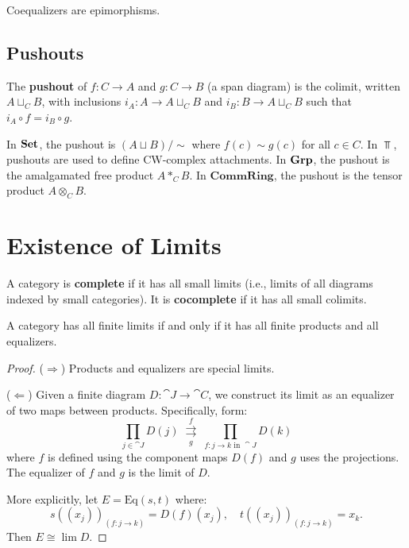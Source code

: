 \begin{proposition}
Coequalizers are epimorphisms.
\end{proposition}

\subsection{Pushouts}

\begin{definition}[Pushout]
The \textbf{pushout} of $f: C \to A$ and $g: C \to B$ (a span diagram) is the colimit, written $A \sqcup_C B$, with inclusions $i_A: A \to A \sqcup_C B$ and $i_B: B \to A \sqcup_C B$ such that $i_A \circ f = i_B \circ g$.
\end{definition}

\begin{example}
In $\mathbf{Set}$, the pushout is $(A \sqcup B) / \sim$ where $f(c) \sim g(c)$ for all $c \in C$. In $\Top$, pushouts are used to define CW-complex attachments. In $\mathbf{Grp}$, the pushout is the amalgamated free product $A *_C B$. In $\mathbf{CommRing}$, the pushout is the tensor product $A \otimes_C B$.
\end{example}

\section{Existence of Limits}

\begin{definition}
A category is \textbf{complete} if it has all small limits (i.e., limits of all diagrams indexed by small categories). It is \textbf{cocomplete} if it has all small colimits.
\end{definition}

\begin{theorem}
A category has all finite limits if and only if it has all finite products and all equalizers.
\end{theorem}

\begin{proof}
($\Rightarrow$) Products and equalizers are special limits.

($\Leftarrow$) Given a finite diagram $D: \cat{J} \to \cat{C}$, we construct its limit as an equalizer of two maps between products. Specifically, form:
\[
  \prod_{j \in \cat{J}} D(j) \;\underset{g}{\overset{f}{\rightrightarrows}}\; \prod_{f: j \to k \text{ in } \cat{J}} D(k)
\]
where $f$ is defined using the component maps $D(f)$ and $g$ uses the projections. The equalizer of $f$ and $g$ is the limit of $D$.

More explicitly, let $E = \text{Eq}(s,t)$ where:
\[
  s\left((x_j)\right)_{(f: j \to k)} = D(f)(x_j), \quad t\left((x_j)\right)_{(f:j\to k)} = x_k.
\]
Then $E \cong \lim D$.
\end{proof}

